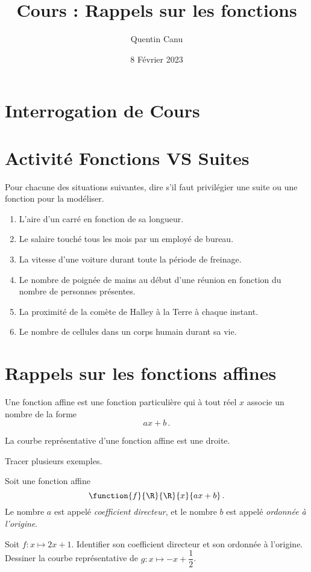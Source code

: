 \documentclass{article}
\title{Cours : Rappels sur les fonctions}
\author{Quentin Canu}
\date{8 Février 2023}
\begin{document}
\maketitle
\section{Interrogation de Cours}
\section{Activité Fonctions VS Suites}
Pour chacune des situations suivantes, dire s'il faut privilégier une suite ou une fonction pour la modéliser.
\begin{enumerate}
\item L'aire d'un carré en fonction de sa longueur.
\item Le salaire touché tous les mois par un employé de bureau.
\item La vitesse d'une voiture durant toute la période de freinage.
\item Le nombre de poignée de mains au début d'une réunion en fonction du nombre de personnes présentes.
\item La proximité de la comète de Halley à la Terre à chaque instant.
\item Le nombre de cellules dans un corps humain durant sa vie.
\end{enumerate}
\section{Rappels sur les fonctions affines}
\begin{definition}
Une fonction affine est une fonction particulière qui à tout réel $x$ associe un nombre de la forme
\begin{equation*}
ax + b\,.
\end{equation*}
\end{definition}
\begin{proposition}
La courbe représentative d'une fonction affine est une droite.  
\end{proposition}
Tracer plusieurs exemples.
\begin{definition}
Soit une fonction affine 
\begin{equation*}
\function{f}{\R}{\R}{x}{ax + b}\,.
\end{equation*}
Le nombre $a$ est appelé \emph{coefficient directeur}, et le nombre $b$ est appelé \emph{ordonnée à l'origine}.
\end{definition}
\begin{example}
Soit $f : x \mapsto 2x + 1$. Identifier son coefficient directeur et son ordonnée à l'origine.
Dessiner la courbe représentative de $g : x \mapsto - x + \dfrac{1}{2}$.
\end{example}
\end{document}
